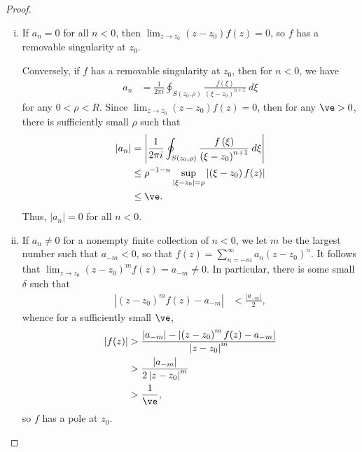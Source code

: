 \documentclass[10pt]{mypackage}
\begin{document}
\begin{proof}\hfill
  \begin{enumerate}[(i)]
    \item If $a_n = 0$ for all $n < 0$, then $\lim_{z\rightarrow z_0} \left( z-z_0 \right)f(z) = 0$, so $f$ has a removable singularity at $z_0$.%

      Conversely, if $f$ has a removable singularity at $z_0$, then for $n < 0$, we have
      \begin{align*}
        a_n &= \frac{1}{2\pi i} \oint_{S\left( z_0,\rho \right)}^{} \frac{f\left( \xi \right)}{\left( \xi - z_0 \right)^{n+1}}\:d\xi
      \end{align*}
      for any $0 < \rho < R$. Since $\lim_{z\rightarrow z_0}\left( z-z_0 \right)f(z) = 0$, then for any $\ve > 0$, there is sufficiently small $\rho$ such that
      \begin{align*}
        \left\vert a_n \right\vert &= \left\vert \frac{1}{2\pi i} \oint_{S\left( z_0,\rho \right)}^{} \frac{f\left( \xi \right)}{\left( \xi-z_0 \right)^{n+1}}\:d\xi \right\vert\\
                                   &\leq \rho^{-1-n} \sup_{\left\vert \xi-z_0 \right\vert = \rho}\left\vert \left( \xi-z_0 \right)f(z) \right\vert\\
                                   &\leq \ve.
      \end{align*}
      Thus, $\left\vert a_n \right\vert = 0$ for all $n < 0$.
    \item If $a_n\neq 0$ for a nonempty finite collection of $n < 0$, we let $m$ be the largest number such that $a_{-m} < 0$, so that $f(z) = \sum_{n=-m}^{\infty}a_n\left( z-z_0 \right)^{n}$. It follows that $\lim_{z\rightarrow z_0}\left( z-z_0 \right)^{m}f(z) = a_{-m}\neq 0$. In particular, there is some small $\delta$ such that
      \begin{align*}
        \left\vert \left( z-z_0 \right)^{m}f(z) - a_{-m} \right\vert &< \frac{\left\vert a_{-m} \right\vert}{2},
      \end{align*}
      whence for a sufficiently small $\ve$,
      \begin{align*}
        \left\vert f(z) \right\vert &> \frac{\left\vert a_{-m} \right\vert-\left\vert \left( z-z_0 \right)^{m}f(z)-a_{-m} \right\vert}{\left\vert z-z_0 \right\vert^{m}}\\
                                    &> \frac{\left\vert a_{-m} \right\vert}{2\left\vert z-z_0 \right\vert^{m}}\\
                                    &> \frac{1}{\ve},
      \end{align*}
      so $f$ has a pole at $z_0$.%


\end{enumerate}
\end{proof}
\end{document}
